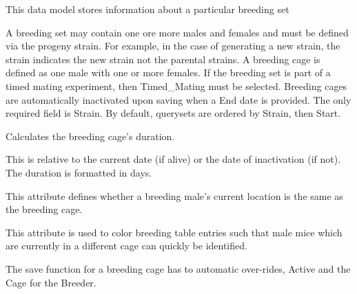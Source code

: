 \documentclass[letterpaper,10pt,english]{sphinxmanual}
\begin{document}
\begin{fulllineitems}
\label{animals:mousedb.animal.models.Breeding}
This data model stores information about a particular breeding set

A breeding set may contain one ore more males and females and must be defined via the progeny strain.  For example, in the case of generating a new strain, the strain indicates the new strain not the parental strains.  A breeding cage is defined as one male with one or more females.  If the breeding set is part of a timed mating experiment, then Timed\_Mating must be selected.  Breeding cages are automatically inactivated upon saving when a End date is provided.  The only required field is Strain.  By default, querysets are ordered by Strain, then Start.

\begin{fulllineitems}
\label{animals:mousedb.animal.models.Breeding.duration}
Calculates the breeding cage's duration.

This is relative to the current date (if alive) or the date of inactivation (if not).
The duration is formatted in days.

\end{fulllineitems}


\begin{fulllineitems}
\label{animals:mousedb.animal.models.Breeding.male_breeding_location_type}
This attribute defines whether a breeding male's current location is the same as the breeding cage.

This attribute is used to color breeding table entries such that male mice which are currently in a different cage can quickly be identified.

\end{fulllineitems}


\begin{fulllineitems}
\label{animals:mousedb.animal.models.Breeding.save}
The save function for a breeding cage has to automatic over-rides, Active and the Cage for the Breeder.


\end{fulllineitems}
\end{fulllineitems}
\end{document}
